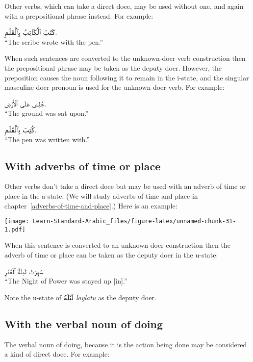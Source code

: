 \documentclass[
  10pt,
]{book}
\begin{document}
Other verbs, which can take a direct doee, may be used without one, and again with a prepositional phrase instead. For example:

\foreignlanguage{arabic}{کَتَبَ ٱلْکَاتِبُ بِٱلْقَلَمِ.}\\
\enquote{The scribe wrote with the pen.}

When such sentences are converted to the unknown-doer verb construction then the prepositional phrase may be taken as the deputy doer. However, the preposition causes the noun following it to remain in the i-state, and the singular masculine doer pronoun is used for the unknown-doer verb. For example:

\foreignlanguage{arabic}{جُلِسَ عَلَى ٱلْأَرْضِ.}\\
\enquote{The ground was sat upon.}

\foreignlanguage{arabic}{کُتِبَ بِٱلْقَلَمِ.}\\
\enquote{The pen was written with.}

\subsection{With adverbs of time or place}\label{with-adverbs-of-time-or-place}

Other verbs don't take a direct doee but may be used with an adverb of time or place in the a-state. (We will study adverbs of time and place in chapter~\ref{adverbs-of-time-and-place}.)
Here is an example:

\texttt{[image: Learn-Standard-Arabic\_files/figure-latex/unnamed-chunk-31-1.pdf]}

When this sentence is converted to an unknown-doer construction then the adverb of time or place can be taken as the deputy doer in the u-state:

\foreignlanguage{arabic}{سُهِرَتْ لَيلَةُ ٱلْقَدْرِ.}\\
\enquote{The Night of Power was stayed up {[}in{]}.}

Note the u-state of \foreignlanguage{arabic}{لَيْلَةُ} \emph{laylatu} as the deputy doer.

\subsection{With the verbal noun of doing}\label{with-the-verbal-noun-of-doing}

The verbal noun of doing, because it is the action being done may be considered a kind of direct doee. For example:
\end{document}
